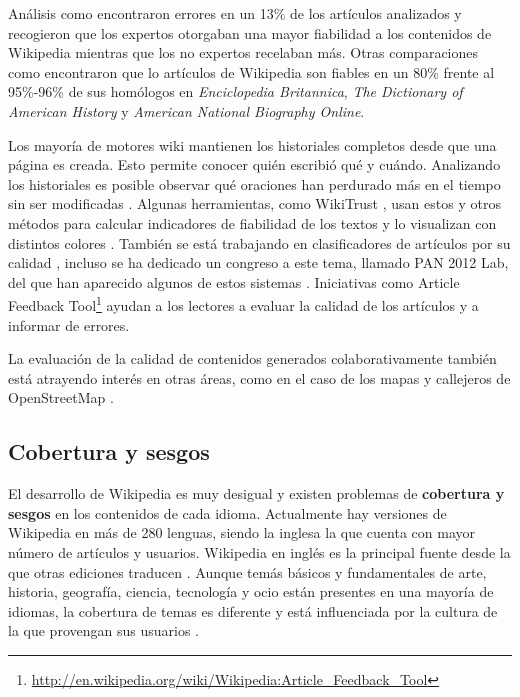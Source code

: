 \documentclass[11pt,onecolumn]{article}
\begin{document}
Análisis como \citep{chesney2006} encontraron errores en un 13\% de los artículos analizados y recogieron que los expertos otorgaban una mayor fiabilidad a los contenidos de Wikipedia mientras que los no expertos recelaban más. Otras comparaciones como \citep{holman2008} encontraron que lo artículos de Wikipedia son fiables en un 80\% frente al 95\%-96\% de sus homólogos en \emph{Enciclopedia Britannica}, \emph{The Dictionary of American History} y \emph{American National Biography Online}.

Los mayoría de motores wiki mantienen los historiales completos desde que una página es creada. Esto permite conocer quién escribió qué y cuándo. Analizando los historiales es posible observar qué oraciones han perdurado más en el tiempo sin ser modificadas \citep{suzuki2012}. Algunas herramientas, como WikiTrust \citep{adler2008}, usan estos y otros métodos para calcular indicadores de fiabilidad de los textos y lo visualizan con distintos colores \citep{westlee2012}. También se está trabajando en clasificadores de artículos por su calidad \citep{wu2012}, incluso se ha dedicado un congreso a este tema, llamado PAN 2012 Lab, del que han aparecido algunos de estos sistemas \citep{ferretti2012} \citep{ferschke2012}. Iniciativas como Article Feedback Tool\footnote{\href{http://en.wikipedia.org/wiki/Wikipedia:Article_Feedback_Tool}{http://en.wikipedia.org/wiki/Wikipedia:Article\_Feedback\_Tool}} ayudan a los lectores a evaluar la calidad de los artículos y a informar de errores.

La evaluación de la calidad de contenidos generados colaborativamente también está atrayendo interés en otras áreas, como en el caso de los mapas y callejeros de OpenStreetMap \citep{mashhadi2012}.

\subsection{Cobertura y sesgos}


El desarrollo de Wikipedia es muy desigual y existen problemas de \textbf{cobertura y sesgos} en los contenidos de cada idioma. Actualmente hay versiones de Wikipedia en más de 280 lenguas, siendo la inglesa la que cuenta con mayor número de artículos y usuarios. Wikipedia en inglés es la principal fuente desde la que otras ediciones traducen \citep{warnckewang2012}. Aunque temás básicos y fundamentales de arte, historia, geografía, ciencia, tecnología y ocio están presentes en una mayoría de idiomas, la cobertura de temas es diferente y está influenciada por la cultura de la que provengan sus usuarios \citep{massa2012}.
\end{document}
